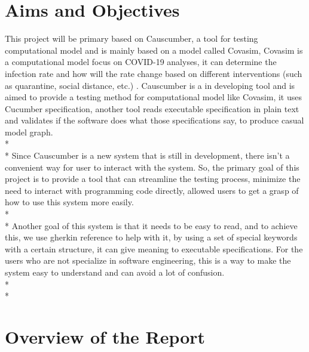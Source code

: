 \section{Aims and Objectives}
This project will be primary based on Causcumber, a tool for testing computational model and is mainly based on a model called Covasim, Covasim is a computational model focus on COVID-19 analyses, it can determine the infection rate and how will the rate change based on different interventions (such as quarantine, social distance, etc.) \cite{Reference4}. Causcumber is a in developing tool and is aimed to provide a testing method for computational model like Covasim, it uses Cucumber specification, another tool reads executable specification in plain text and validates if the software does what those specifications say, to produce casual model graph. \\*\\*
Since Causcumber is a new system that is still in development, there isn’t a convenient way for user to interact with the system. So, the primary goal of this project is to provide a tool that can streamline the testing process, minimize the need to interact with programming code directly, allowed users to get a grasp of how to use this system more easily. \\*\\*
Another goal of this system is that it needs to be easy to read, and to achieve this, we use gherkin reference to help with it, by using a set of special keywords with a certain structure, it can give meaning to executable specifications. For the users who are not specialize in software engineering, this is a way to make the system easy to understand and can avoid a lot of confusion. \\*\\*

\section{Overview of the Report}

